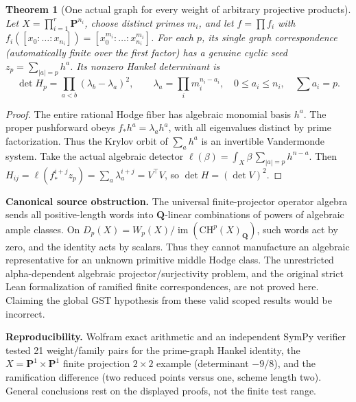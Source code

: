\documentclass[11pt]{article}
\newtheorem{theorem}{Theorem}
\newcommand{\Q}{\mathbf Q}
\newcommand{\PP}{\mathbf P}
\newcommand{\CH}{\mathrm{CH}}
\begin{document}
\begin{theorem}[One actual graph for every weight of arbitrary projective products]
Let \(X=\prod_{i=1}^r\PP^{n_i}\), choose distinct primes \(m_i\), and let \(f=\prod f_i\) with \(f_i([x_0:\ldots:x_{n_i}])=[x_0^{m_i}:\ldots:x_{n_i}^{m_i}]\). For each \(p\), its single graph correspondence (automatically finite over the first factor) has a genuine cyclic seed \(z_p=\sum_{|a|=p}h^a\). Its nonzero Hankel determinant is
\[
\boxed{\det H_p=\prod_{a<b}(\lambda_b-\lambda_a)^2,\qquad
\lambda_a=\prod_i m_i^{n_i-a_i},\quad 0\le a_i\le n_i,\quad \sum a_i=p.}
\]
\end{theorem}
\begin{proof}
The entire rational Hodge fiber has algebraic monomial basis \(h^a\). The proper pushforward obeys \(f_*h^a=\lambda_a h^a\), with all eigenvalues distinct by prime factorization. Thus the Krylov orbit of \(\sum_a h^a\) is an invertible Vandermonde system. Take the actual algebraic detector \(\ell(\beta)=\int_X\beta\,\sum_{|a|=p}h^{n-a}\). Then \(H_{ij}=\ell(f_*^{i+j}z_p)=\sum_a\lambda_a^{i+j}=V^\top V\), so \(\det H=(\det V)^2\).
\end{proof}

\noindent\textbf{Canonical source obstruction.} The universal finite-projector operator algebra sends all positive-length words into \(\Q\)-linear combinations of powers of algebraic ample classes. On \(D_p(X)=W_p(X)/\operatorname{im}(\CH^p(X)_\Q)\), such words act by zero, and the identity acts by scalars. Thus they cannot manufacture an algebraic representative for an unknown primitive middle Hodge class. The unrestricted alpha-dependent algebraic projector/surjectivity problem, and the original strict Lean formalization of ramified finite correspondences, are not proved here. Claiming the global GST hypothesis from these valid scoped results would be incorrect.

\noindent\textbf{Reproducibility.} Wolfram exact arithmetic and an independent SymPy verifier tested 21 weight/family pairs for the prime-graph Hankel identity, the \(X=\PP^1\times\PP^1\) finite projection \(2\times2\) example (determinant \(-9/8\)), and the ramification difference (two reduced points versus one, scheme length two). General conclusions rest on the displayed proofs, not the finite test range.
\end{document}
